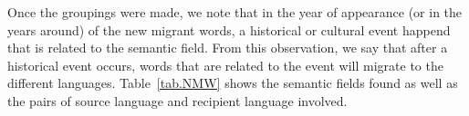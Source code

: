 \documentclass[10pt,letterpaper]{article} %
\begin{document}
	Once the groupings were made, we note that in the year of appearance (or in the years around) of the new migrant words, a historical or cultural event happend that is related to the semantic field. From this observation, we say that after a historical event occurs, words that are related to the event will migrate to the different languages. Table~\ref{tab.NMW} shows the semantic fields found as well as the pairs of source language and recipient language involved.
	
	
	
	
	
	
\end{document}
